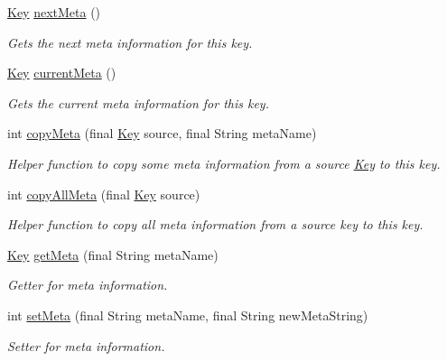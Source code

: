 \begin{DoxyCompactItemize}
\hyperlink{classorg_1_1libelektra_1_1Key}{Key} \hyperlink{classorg_1_1libelektra_1_1Key_ace2853c3ca003e9099272871a6d61ad6}{next\+Meta} ()
\begin{DoxyCompactList}\small\item\em Gets the next meta information for this key. \end{DoxyCompactList}\item 
\hyperlink{classorg_1_1libelektra_1_1Key}{Key} \hyperlink{classorg_1_1libelektra_1_1Key_af6a740822cebbda1e500093c4d69c5f8}{current\+Meta} ()
\begin{DoxyCompactList}\small\item\em Gets the current meta information for this key. \end{DoxyCompactList}\item 
int \hyperlink{classorg_1_1libelektra_1_1Key_a421a4240ce01f2f196bdce7b3c1d02c2}{copy\+Meta} (final \hyperlink{classorg_1_1libelektra_1_1Key}{Key} source, final String meta\+Name)
\begin{DoxyCompactList}\small\item\em Helper function to copy some meta information from a source \hyperlink{classorg_1_1libelektra_1_1Key}{Key} to this key. \end{DoxyCompactList}\item 
int \hyperlink{classorg_1_1libelektra_1_1Key_a9483ae832c9c16e4d68ed1c26babe2ce}{copy\+All\+Meta} (final \hyperlink{classorg_1_1libelektra_1_1Key}{Key} source)
\begin{DoxyCompactList}\small\item\em Helper function to copy all meta information from a source key to this key. \end{DoxyCompactList}\item 
\hyperlink{classorg_1_1libelektra_1_1Key}{Key} \hyperlink{classorg_1_1libelektra_1_1Key_a49d5d04f67917075c7b1513249777ccf}{get\+Meta} (final String meta\+Name)
\begin{DoxyCompactList}\small\item\em Getter for meta information. \end{DoxyCompactList}\item 
int \hyperlink{classorg_1_1libelektra_1_1Key_ac8c73ca3d16cf4454bd326ebe469cf2d}{set\+Meta} (final String meta\+Name, final String new\+Meta\+String)
\begin{DoxyCompactList}\small\item\em Setter for meta information. \end{DoxyCompactList}\item 

\end{DoxyCompactItemize}
